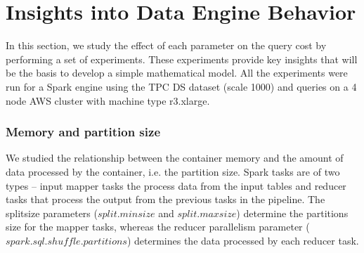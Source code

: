 \section{Insights into Data Engine Behavior}
\label{sec:insights}
 In this section, we study the effect of each parameter on the query cost by performing a set of experiments. These experiments provide key insights that will be the basis to develop a simple mathematical model. All the experiments were run for a Spark engine using the TPC DS dataset (scale 1000) and queries on a 4 node AWS cluster with machine type r3.xlarge.
 



\subsubsection*{Memory and partition size}
We studied the relationship between the container memory and the amount of data processed by the container, i.e. the partition size.  Spark tasks are of two types -- input mapper tasks the process data from the input tables and reducer tasks that process the output from the previous tasks in the pipeline. The splitsize parameters ($split.minsize$ and $split.maxsize$) determine the partitions size for the mapper tasks, whereas the reducer parallelism parameter ($spark.sql.shuffle.partitions$) determines the data processed by each reducer task.

